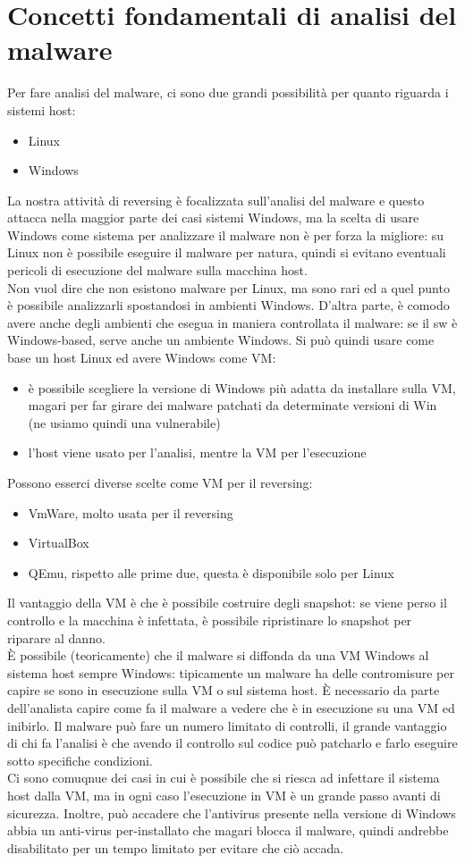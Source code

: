 \documentclass[12pt, oneside]{extbook}
\begin{document}
\section{Concetti fondamentali di analisi del malware}
Per fare analisi del malware, ci sono due grandi possibilità per quanto riguarda i sistemi host:
\begin{itemize}
\item Linux
\item Windows
\end{itemize}
La nostra attività di reversing è focalizzata sull'analisi del malware e questo attacca nella maggior parte dei casi sistemi Windows, ma la scelta di usare Windows come sistema per analizzare il malware non è per forza la migliore: su Linux non è possibile eseguire il malware per natura, quindi si evitano eventuali pericoli di esecuzione del malware sulla macchina host.\\ Non vuol dire che non esistono malware per Linux, ma sono rari ed a quel punto è possibile analizzarli spostandosi in ambienti Windows. D'altra parte, è comodo avere anche degli ambienti che esegua in maniera controllata il malware: se il sw è Windows-based, serve anche un ambiente Windows. Si può quindi usare come base un host Linux ed avere Windows come VM:
\begin{itemize}
\item è possibile scegliere la versione di Windows più adatta da installare sulla VM, magari per far girare dei malware patchati da determinate versioni di Win (ne usiamo quindi una vulnerabile)
\item l'host viene usato per l'analisi, mentre la VM per l'esecuzione
\end{itemize}
Possono esserci diverse scelte come VM per il reversing:
\begin{itemize}
\item VmWare, molto usata per il reversing
\item VirtualBox
\item QEmu, rispetto alle prime due, questa è disponibile solo per Linux
\end{itemize}
Il vantaggio della VM è che è possibile costruire degli snapshot: se viene perso il controllo e la macchina è infettata, è possibile ripristinare lo snapshot per riparare al danno.\\ È possibile (teoricamente) che il malware si diffonda da una VM Windows al sistema host sempre Windows: tipicamente un malware ha delle contromisure per capire se sono in esecuzione sulla VM o sul sistema host. È necessario da parte dell'analista capire come fa il malware a vedere che è in esecuzione su una VM ed inibirlo. Il malware può fare un numero limitato di controlli, il grande vantaggio di chi fa l'analisi è che avendo il controllo sul codice può patcharlo e farlo eseguire sotto specifiche condizioni.\\ Ci sono comuqnue dei casi in cui è possibile che si riesca ad infettare il sistema host dalla VM, ma in ogni caso l'esecuzione in VM è un grande passo avanti di sicurezza. Inoltre, può accadere che l'antivirus presente nella versione di Windows abbia un anti-virus per-installato che magari blocca il malware, quindi andrebbe disabilitato per un tempo limitato per evitare che ciò accada.
\end{document}
